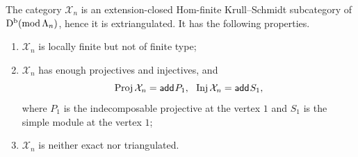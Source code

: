 \documentclass[11pt, twoside]{article}
\numberwithin{equation}{section}
\newcommand{\add}{\mathsf{add}\hspace{.01in}}
\begin{document}
\begin{proposition}\label{prop:infinite-genuine-example}
The category $\mathcal X_n$ is an extension-closed Hom-finite
Krull--Schmidt subcategory of $\mathrm D^{\mathrm b}(\operatorname{mod}\Lambda_n)$, hence it is
extriangulated.  It has the following properties.
\begin{enumerate}[label=\textup{(\roman*)},leftmargin=2.7em]
\item $\mathcal X_n$ is locally finite but not of finite type;
\item $\mathcal X_n$ has enough projectives and injectives, and
\[
 \Proj\mathcal X_n=\add P_1,
~~
 \Inj\mathcal X_n=\add S_1,
\]
where $P_1$ is the indecomposable projective at the vertex $1$ and $S_1$ is
the simple module at the vertex $1$;
\item $\mathcal X_n$ is neither exact nor triangulated.
\end{enumerate}
\end{proposition}
\end{document}

